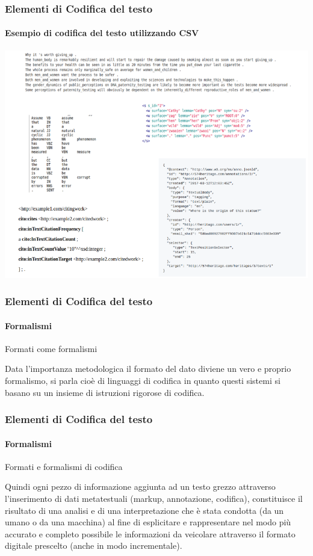 \begin{frame}
	\frametitle{Elementi di Codifica del testo}
	\framesubtitle{Esempio di codifica del testo utilizzando CSV}
	\addtocounter{nframe}{1}

		
			\includegraphics[width=1.1\textwidth]{imgs/VariRappresentazioniTesto.png}
		
	
\end{frame}



\begin{frame}
	\frametitle{Elementi di Codifica del testo}
	\framesubtitle{Formalismi}
	\addtocounter{nframe}{1}

	\begin{block}{Formati come formalismi}
		\begin{center}
			Data l'importanza metodologica il formato del dato diviene un vero e proprio formalismo, si parla cioè di linguaggi di codifica in quanto questi sistemi si basano su un insieme di istruzioni rigorose di codifica.
		\end{center}

	\end{block}

\end{frame}



\begin{frame}
	\frametitle{Elementi di Codifica del testo}
	\framesubtitle{Formalismi}
	\addtocounter{nframe}{1}

	\begin{block}{Formati e formalismi di codifica}

		Quindi ogni pezzo di informazione aggiunta ad un testo grezzo attraverso l'inserimento di dati metatestuali (markup, annotazione, codifica), constituisce il risultato di una analisi e di una interpretazione che è stata condotta (da un umano o da una macchina) al fine di esplicitare e rappresentare nel modo più accurato e completo possibile le informazioni da veicolare attraverso il formato digitale prescelto (anche in modo incrementale).


	\end{block}

\end{frame}





